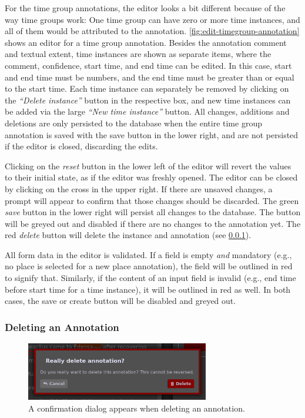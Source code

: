 For the time group annotations, the editor looks a bit different because of the way time groups work:
One time group can have zero or more time instances, and all of them would be attributed to the annotation.
\cref{fig:edit-timegroup-annotation} shows an editor for a time group annotation.
Besides the annotation comment and textual extent, time instances are shown as separate items, where the comment, confidence, start time, and end time can be edited.
In this case, start and end time must be numbers, and the end time must be greater than or equal to the start time.
Each time instance can separately be removed by clicking on the \emph{\enquote{Delete instance}} button in the respective box, and new time instances can be added via the large \emph{\enquote{New time instance}} button.
All changes, additions and deletions are only persisted to the database when the entire time group annotation is saved with the save button in the lower right, and are not persisted if the editor is closed, discarding the edits.

Clicking on the \emph{reset} button in the lower left of the editor will revert the values to their initial state, as if the editor was freshly opened.
The editor can be closed by clicking on the cross in the upper right.
If there are unsaved changes, a prompt will appear to confirm that those changes should be discarded.
The green \emph{save} button in the lower right will persist all changes to the database.
The button will be greyed out and disabled if there are no changes to the annotation yet.
The red \emph{delete} button will delete the instance and annotation (see \cref{sec:annotation-deletion}).

All form data in the editor is validated.
If a field is empty \emph{and} mandatory (e.g., no place is selected for a new place annotation), the field will be outlined in red to signify that.
Similarly, if the content of an input field is invalid (e.g., end time before start time for a time instance), it will be outlined in red as well.
In both cases, the save or create button will be disabled and greyed out.


\subsubsection{Deleting an Annotation}
\label{sec:annotation-deletion}

\begin{figure}[htb]
  \centering
  \includegraphics[width=8cm]{../src/assets/annotator-documentation/delete-annotation.png}

  \caption{
    A confirmation dialog appears when deleting an annotation.
  }
  \label{fig:delete-annotation}
\end{figure}


